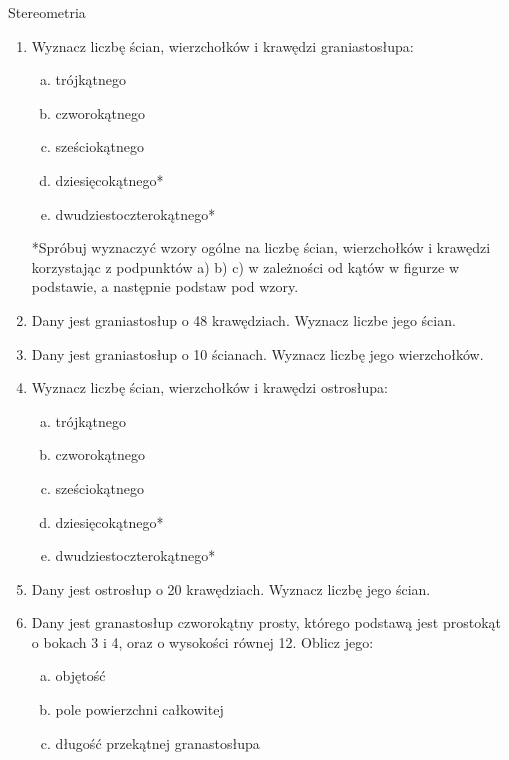 \documentclass[12pt,a4paper]{article}
\begin{document}
	\begin{center}
		\LARGE Stereometria
	\end{center}
	\vspace{1cm}
	
	
	\begin{enumerate}[1.]
		\item Wyznacz liczbę ścian, wierzchołków i krawędzi graniastosłupa:
		\begin{enumerate}[a)]
			\item trójkątnego
			\item czworokątnego
			\item sześciokątnego
			\item dziesięcokątnego*
			\item dwudziestoczterokątnego*
		\end{enumerate}
		
		*Spróbuj wyznaczyć wzory ogólne na liczbę ścian, wierzchołków i krawędzi korzystając z podpunktów a) b) c) w zależności od kątów w figurze w podstawie, a następnie podstaw pod wzory.
		
		\item Dany jest graniastosłup o 48 krawędziach. Wyznacz liczbe jego ścian.
		\item Dany jest graniastosłup o 10 ścianach. Wyznacz liczbę jego wierzchołków.
		
		\item Wyznacz liczbę ścian, wierzchołków i krawędzi ostrosłupa:
		\begin{enumerate}[a)]
			\item trójkątnego
			\item czworokątnego
			\item sześciokątnego
			\item dziesięcokątnego*
			\item dwudziestoczterokątnego*
		\end{enumerate}
	
	\item Dany jest ostrosłup o 20 krawędziach. Wyznacz liczbę jego ścian.
	
	\item Dany jest granastosłup czworokątny prosty, którego podstawą jest prostokąt o bokach 3 i 4, oraz o wysokości równej 12. Oblicz jego:
	\begin{enumerate}[a)]
		\item objętość
		\item pole powierzchni całkowitej
		\item długość przekątnej granastosłupa
	\end{enumerate}


\end{enumerate}
\end{document}
